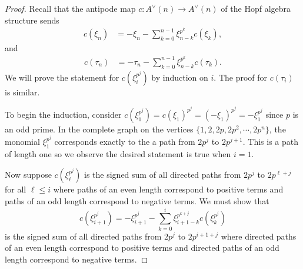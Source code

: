 \documentclass[10pt,a4paper]{amsart}
\begin{document}
\begin{proof}
Recall that the antipode map $c: A^\vee (n) \to A^\vee (n)$ of the Hopf algebra structure sends
\begin{align*}
    c(\xi_n) & = - \xi_n - \sum_{k = 0}^{n - 1} \xi_{n - k}^{p^k} c (\xi_k),
\end{align*}
and
\begin{align*}
    c(\tau_n) & = - \tau_n - \sum_{k = 0}^{ n - 1} \xi_{n - k}^{p^k} c(\tau_k).
\end{align*}
We will prove the statement for $c(\xi_i^{p^j})$ by induction on $i$. The proof for $c(\tau_i)$ is similar. 

To begin the induction, consider $c(\xi_1^{p^j}) = c(\xi_1)^{p^j} = (-\xi_1)^{p^j} = - \xi_1^{p^j}$ since $p$ is an odd prime. In the  complete graph on the vertices $\{1,2, 2p , 2p^2, \cdots, 2p^n\}$, the monomial $\xi_1^{p^j}$ corresponds exactly to the a path from $2p^j$ to $2p^{j + 1}$.\color{black} This is a path of length one so we observe the desired statement is true when $i = 1$. 

Now suppose $c(\xi_\ell^{p^j})$ is the signed sum of all directed paths from $2{p^j}$ to $2 p^{\ell + j}$ for all $\ell \leq i$ where paths of an even length correspond to positive terms and paths of an odd length correspond to negative terms. We must show that 
\begin{equation} \label{eq:conj}
c(\xi_{i + 1}^{p^j}) = - \xi_{i + 1}^{p^j} - \sum_{k = 0}^{i} \xi_{i + 1 - k}^{p^{k + j}} c(\xi_k^{p^j})
\end{equation}
is the signed sum of all directed paths from $2p^j$ to $2p^{i + 1 + j}$ where directed paths of an even length correspond to positive terms and directed paths of an odd length correspond to negative terms.


\end{proof}
\end{document}
